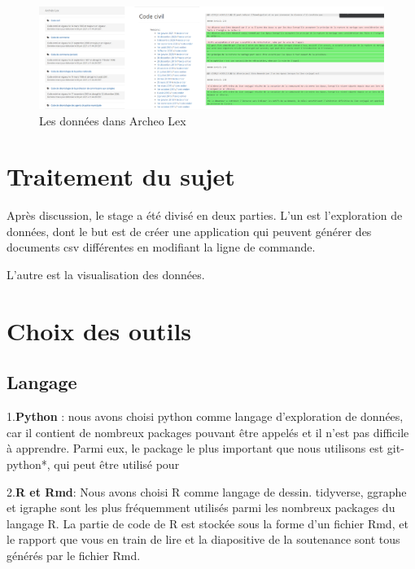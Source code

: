 \documentclass[
  oneside]{book}
\begin{document}
\begin{figure}

{\centering \includegraphics{images/archeolex_structure} 

}

\caption{Les données dans Archeo Lex}\label{fig:ArcheoLex}
\end{figure}

\hypertarget{traitement-du-sujet}{%
\section{Traitement du sujet}\label{traitement-du-sujet}}

Après discussion, le stage a été divisé en deux parties.
L'un est l'exploration de données, dont le but est de créer une application qui peuvent générer des documents csv différentes en modifiant la ligne de commande.

L'autre est la visualisation des données.

\hypertarget{choix-des-outils}{%
\section{Choix des outils}\label{choix-des-outils}}

\hypertarget{langage}{%
\subsection{Langage}\label{langage}}

1.\textbf{Python} : nous avons choisi python comme langage d'exploration de données, car il contient de nombreux packages pouvant être appelés et il n'est pas difficile à apprendre.
Parmi eux, le package le plus important que nous utilisons est git-python*, qui peut être utilisé pour

2.\textbf{R et Rmd}: Nous avons choisi R comme langage de dessin. tidyverse, ggraphe et igraphe sont les plus fréquemment utilisés parmi les nombreux packages du langage R. La partie de code de R est stockée sous la forme d'un fichier Rmd, et le rapport que vous en train de lire et la diapositive de la soutenance sont tous générés par le fichier Rmd.
\end{document}
